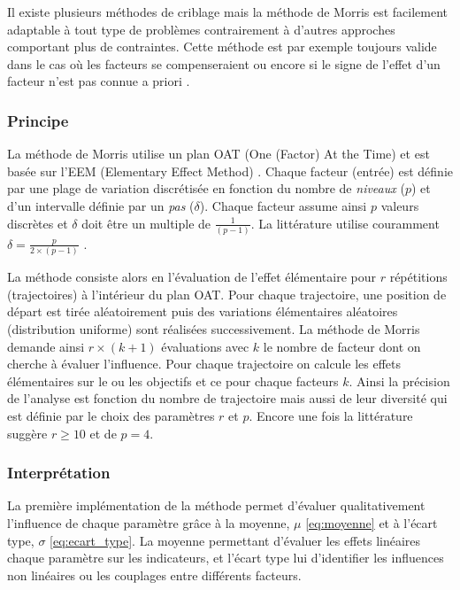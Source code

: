 Il existe plusieurs méthodes de criblage mais la méthode de Morris \parencite{Morris1991161}
est facilement adaptable à tout type de problèmes contrairement à d’autres approches
comportant plus de contraintes. Cette méthode est par exemple toujours valide dans le cas où
les facteurs se compenseraient ou encore si le signe de l’effet d’un facteur n’est pas
connue a priori \parencite{Saltelli2004}.


\subsubsection{Principe} %
\label{ssub:principe}
La méthode de Morris utilise un plan OAT (One (Factor) At the Time) et est basée sur
l’EEM (Elementary Effect Method) \parencite{Saltelli2004}.
Chaque facteur (entrée) est définie par une plage de variation discrétisée en fonction
du nombre de \emph{niveaux} ($p$) et d’un intervalle définie par un \emph{pas} ($\delta$).
Chaque facteur assume ainsi $p$ valeurs discrètes et $\delta$ doit être un multiple de
$\frac{1}{(p - 1)}$. La littérature utilise couramment $\delta = \frac{p}{2 \times (p - 1)}$
\parencite{Morris1991161, Campolongo20071509}.

La méthode consiste alors en l’évaluation de l’effet élémentaire pour $r$ répétitions
(trajectoires) à l’intérieur du plan OAT. Pour chaque trajectoire, une position de départ
est tirée aléatoirement puis des variations élémentaires aléatoires (distribution uniforme)
sont réalisées successivement. La méthode de Morris demande ainsi $r \times (k + 1)$ évaluations
avec $k$ le nombre de facteur dont on cherche à évaluer l’influence. Pour chaque trajectoire
on calcule les effets élémentaires sur le ou les objectifs et ce pour chaque facteurs $k$.
Ainsi la précision de l’analyse est fonction du nombre de trajectoire mais aussi
de leur diversité qui est définie par le choix des paramètres $r$ et $p$.
Encore une fois la littérature suggère $r \geq 10$ et de $p = 4$.



\subsubsection{Interprétation} %
\label{ssub:interpretation}
La première implémentation de la méthode permet d’évaluer qualitativement l’influence de chaque
paramètre grâce à la moyenne, $\mu$ \eqref{eq:moyenne} et à l’écart type, $\sigma$ \eqref{eq:ecart_type}.
La moyenne permettant d’évaluer les effets linéaires chaque paramètre sur les indicateurs,
et l’écart type lui d’identifier les influences non linéaires ou les couplages entre différents facteurs.

